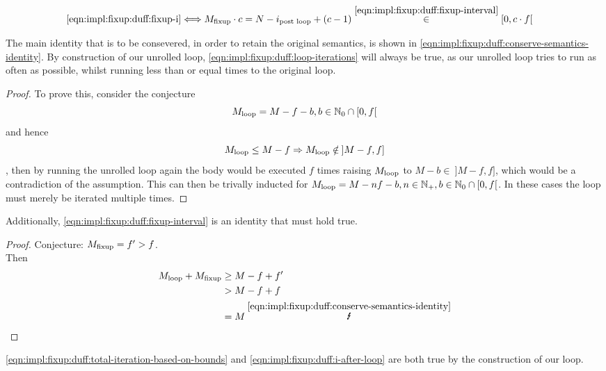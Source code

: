 \begin{equation}\label{eqn:impl:fixup:duff:fixup-i-mult}
    \begin{aligned}
        \ref{eqn:impl:fixup:duff:fixup-i} &\Longleftrightarrow M_{\text{fixup}} \cdot c = N - i_\text{post loop} + (c - 1) \overset{\ref{eqn:impl:fixup:duff:fixup-interval}}{\in} \lbrack 0, c \cdot f \lbrack
    \end{aligned}
\end{equation}

The main identity that is to be consevered, in order to retain the original semantics, is shown in \cref{eqn:impl:fixup:duff:conserve-semantics-identity}.
By construction of our unrolled loop, \cref{eqn:impl:fixup:duff:loop-iterations} will always be true, as our unrolled loop tries to run as often as possible, whilst running less than or equal times to the original loop.

\begin{proof}\label{proof:impl:fixup:duff:loop-iterations}
    To prove this, consider the conjecture
    \[M_{\text{loop}} = M - f - b,  b \in \mathbb{N}_0 \cap \lbrack 0, f \lbrack\]
    and hence
    \[M_{\text{loop}} \leq M - f \Rightarrow M_{\text{loop}} \notin \medspace \rbrack M-f,f \rbrack\]
    , then by running the unrolled loop again the body would be executed $f$ times raising $M_{\text{loop}}$ to $M - b \in \medspace \rbrack M-f,f \rbrack$, which would be a contradiction of the assumption.
    This can then be trivally inducted for $M_{\text{loop}} = M - nf - b, n \in \mathbb{N}_{+}, b \in \mathbb{N}_0 \cap \lbrack 0, f \lbrack$.
    In these cases the loop must merely be iterated multiple times.
\end{proof}

Additionally, \cref{eqn:impl:fixup:duff:fixup-interval} is an identity that must hold true.
\begin{proof}\label{proof:impl:fixup:duff:fixup-interval}
    Conjecture: $M_{\text{fixup}} = f' > f$.\\
    Then
    \begin{align*}
        \Mloop + \Mfixup &\geq M - f + f' \\
        &> M - f + f \\
        &= M \medspace \overset{\ref{eqn:impl:fixup:duff:conserve-semantics-identity}}{\mLightning}
    \end{align*}
\end{proof}

\cref{eqn:impl:fixup:duff:total-iteration-based-on-bounds} and \cref{eqn:impl:fixup:duff:i-after-loop} are both true by the construction of our loop.

